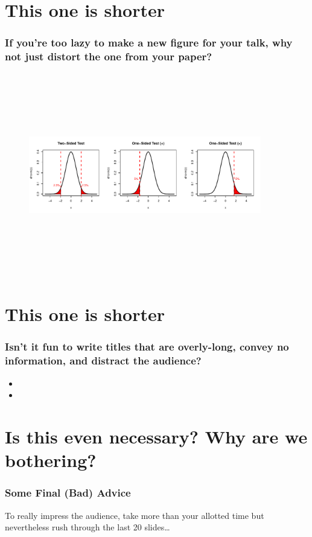 \documentclass{beamer}
\begin{document}
\section{This one is shorter}
\begin{frame}
  \frametitle{If you're too lazy to make a new figure for your talk, why not just distort the one from your paper?}

  \begin{figure}
    \centering
    \includegraphics[width=4in,height=3.5in]{onesided_vs_twosided.pdf}
  \end{figure}

\end{frame} 
\section{This one is shorter}
\begin{frame}
  \frametitle{Isn't it fun to write titles that are overly-long, convey no information, and distract the audience?}
    \scriptsize
  \begin{itemize}
    \item \lipsum[1]
    \item \lipsum[2]
  \end{itemize}
\end{frame} 
\section{Is this even necessary? Why are we bothering?}
\begin{frame}
  \frametitle{Some Final (Bad) Advice}
To really impress the audience, take more than your allotted time but nevertheless rush through the last 20 slides\ldots 
\end{frame} 
\end{document}
